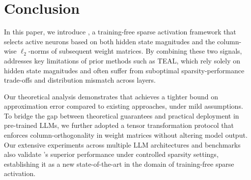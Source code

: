 \section{Conclusion}\label{sec:conclusion}

In this paper, we introduce \algacro{}, a training-free sparse activation framework that selects active neurons based on both hidden state magnitudes and the column-wise $\ell_2$-norms of subsequent weight matrices. By combining these two signals, \algacro{} addresses key limitations of prior methods such as TEAL, which rely solely on hidden state magnitudes and often suffer from suboptimal sparsity-performance trade-offs and distribution mismatch across layers.

Our theoretical analysis demonstrates that \algacro{} achieves a tighter bound on approximation error compared to existing approaches, under mild assumptions. To bridge the gap between theoretical guarantees and practical deployment in pre-trained LLMs, we further adopted a tensor transformation protocol that enforces column-orthogonality in weight matrices without altering model output.
Our extensive experiments across multiple LLM architectures and benchmarks also validate \algacro{}’s superior performance under controlled sparsity settings, establishing it as a new state-of-the-art in the domain of training-free sparse activation.


